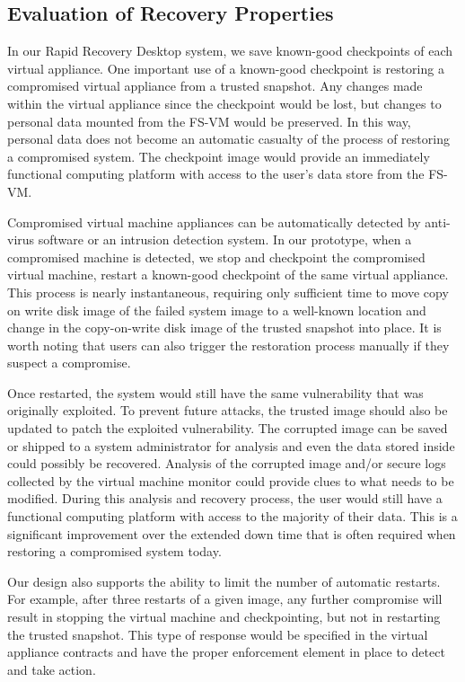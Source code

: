 \subsection{Evaluation of Recovery Properties} 

In our Rapid Recovery Desktop system, we save known-good checkpoints of each virtual appliance.  One important use of a known-good checkpoint is restoring a compromised virtual appliance from a trusted snapshot.  Any changes made within the virtual appliance since the checkpoint would be lost, but changes to personal data mounted from the FS-VM would be preserved.  In this way, personal data does not become an automatic casualty of the process of restoring a compromised system. The checkpoint image would provide an immediately functional computing platform with access to the user’s data store from the FS-VM.
 
Compromised virtual machine appliances can be automatically detected by anti-virus software or an intrusion detection system. In our prototype, when a compromised machine is detected, we stop and checkpoint the compromised virtual machine, restart a known-good checkpoint of the same virtual appliance. This process is nearly instantaneous, requiring only sufficient time to move copy on write disk image of the failed system image to a well-known location and change in the copy-on-write disk image of the trusted snapshot into place. It is worth noting that users can also trigger the restoration process manually if they suspect a compromise.
 
Once restarted, the system would still have the same vulnerability that was originally exploited.  To prevent future attacks, the trusted image should also be updated to patch the exploited vulnerability. The corrupted image can be saved or shipped to a system administrator for analysis and even the data stored inside could possibly be recovered.  Analysis of the corrupted image and/or secure logs collected by the virtual machine monitor\cite{king_2003} could provide clues to what needs to be modified.  During this analysis and recovery process, the user would still have a functional computing platform with access to the majority of their data. This is a significant improvement over the extended down time that is often required when restoring a compromised system today.
 
Our design also supports the ability to limit the number of automatic restarts. For example, after three restarts of a given image, any further compromise will result in stopping the virtual machine and checkpointing, but not in restarting the trusted snapshot. This type of response would be specified in the virtual appliance contracts and have the proper enforcement element in place to detect and take action.
 
